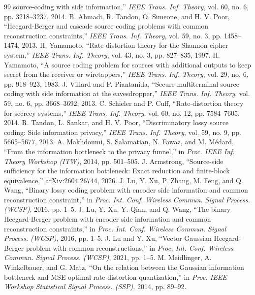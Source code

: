 \documentclass[11pt,onecolumn]{IEEEtran}
\begin{document}
\begin{thebibliography}{99}
source-coding with side information,'' \emph{IEEE Trans. Inf. Theory},
vol. 60, no. 6, pp. 3218--3237, 2014.
 B. Ahmadi, R. Tandon, O. Simeone, and H. V. Poor,
``Heegard-Berger and cascade source coding problems with common reconstruction
constraints,'' \emph{IEEE Trans. Inf. Theory}, vol. 59, no. 3,
pp. 1458--1474, 2013.
 H. Yamamoto, ``Rate-distortion theory for the Shannon
cipher system,'' \emph{IEEE Trans. Inf. Theory}, vol. 43, no. 3, pp. 827--835,
1997.
 H. Yamamoto, ``A source coding problem for sources
with additional outputs to keep secret from the receiver or wiretappers,''
\emph{IEEE Trans. Inf. Theory}, vol. 29, no. 6, pp. 918--923, 1983.
 J. Villard and P. Piantanida, ``Secure multiterminal
source coding with side information at the eavesdropper,'' \emph{IEEE Trans.
Inf. Theory}, vol. 59, no. 6, pp. 3668--3692, 2013.
 C. Schieler and P. Cuff, ``Rate-distortion theory for
secrecy systems,'' \emph{IEEE Trans. Inf. Theory}, vol. 60, no. 12,
pp. 7584--7605, 2014.
 R. Tandon, L. Sankar, and H. V. Poor,
``Discriminatory lossy source coding: Side information privacy,''
\emph{IEEE Trans. Inf. Theory}, vol. 59, no. 9, pp. 5665--5677, 2013.
 A. Makhdoumi, S. Salamatian, N. Fawaz, and
M. M\'edard, ``From the information bottleneck to the privacy funnel,''
in \emph{Proc. IEEE Inf. Theory Workshop (ITW)}, 2014, pp. 501--505.
 J. Armstrong, ``Source-side sufficiency for the
information bottleneck: Exact reduction and finite-block equivalence,''
arXiv:2604.26744, 2026.
 J. Lu, Y. Xu, P. Zhang, M. Feng, and Q. Wang, ``Binary
lossy coding problem with encoder side information and common reconstruction
constraint,'' in \emph{Proc. Int. Conf. Wireless Commun. Signal Process.
(WCSP)}, 2016, pp. 1--5.
 J. Lu, Y. Xu, Y. Qian, and Q. Wang, ``The binary
Heegard-Berger problem with encoder side information and common reconstruction
constraints,'' in \emph{Proc. Int. Conf. Wireless Commun. Signal Process.
(WCSP)}, 2016, pp. 1--5.
 J. Lu and Y. Xu, ``Vector Gaussian Heegard-Berger problem
with common reconstructions,'' in \emph{Proc. Int. Conf. Wireless Commun. Signal
Process. (WCSP)}, 2021, pp. 1--5.
 M. Meidlinger, A. Winkelbauer, and G. Matz, ``On the
relation between the Gaussian information bottleneck and MSE-optimal
rate-distortion quantization,'' in \emph{Proc. IEEE Workshop Statistical Signal
Process. (SSP)}, 2014, pp. 89--92.

\end{thebibliography}
\end{document}
